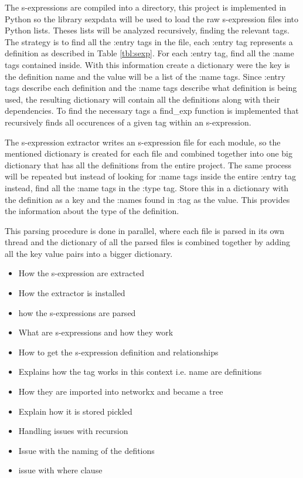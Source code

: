 
The s-expressions are compiled into a directory, this project is implemented in
Python so the library sexpdata will be used to load the raw s-expression files
into Python lists. Theses lists will be analyzed recursively, finding the
relevant tags. The strategy is to find all the :entry tags in the file, each
:entry tag represents a definition as described in Table \ref{tbl:sexp}. For
each :entry tag, find all the :name tags contained inside. With this
information create a dictionary were the key is the definition name and the
value will be a list of the :name tags. Since :entry tags describe each
definition and the :name tags describe what definition is being used, the
resulting dictionary will contain all the definitions along with their
dependencies. To find the necessary tags a \textsf{find\_exp} function is
implemented that recursively finds all occurences of a given tag within an
s-expression.

The s-expression extractor writes an s-expression file for each module, so the
mentioned dictionary is created for each file and combined together into one
big dictionary that has all the definitions from the entire project. The same
process will be repeated but instead of looking for :name tags inside the
entire :entry tag instead, find all the :name tags in the :type tag. Store this
in a dictionary with the definition as a key and the :names found in :tag as
the value. This provides the information about the type of the definition.

This parsing procedure is done in parallel, where each file is parsed in its
own thread and the dictionary of all the parsed files is combined together by
adding all the key value pairs into a bigger dictionary.

\begin{itemize}
    \item How the s-expression are extracted
    \item How the extractor is installed
    \item how the s-expressions are parsed
    \item What are s-expressions and how they work
    \item How to get the s-expression definition and relationships
    \item Explains how the tag works in this context i.e. name are definitions 
    \item How they are imported into networkx and became a tree
    \item Explain how it is stored pickled 
    \item Handling issues with recursion 
    \item Issue with the naming of the defitions 
    \item issue with where clause
\end{itemize}

